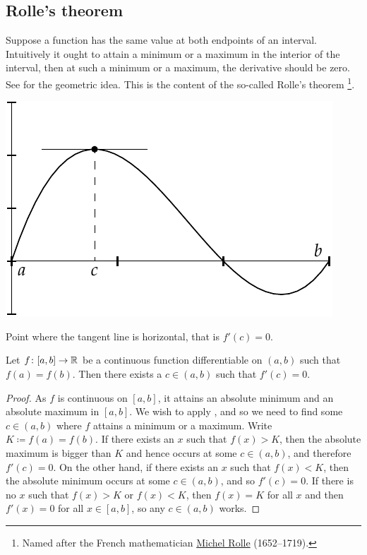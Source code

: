 \subsection{Rolle's theorem}

Suppose a function has the same value at both endpoints of an interval.
Intuitively it ought to attain a minimum or a maximum in the interior of the
interval,
then at such a minimum or a maximum, the derivative should be zero.
See  for the geometric idea.  This is the content of the
so-called Rolle's theorem%
\footnote{Named after the French mathematician
\href{https://en.wikipedia.org/wiki/Michel_Rolle}{Michel Rolle}
(1652--1719).}.

\begin{myfigureht}
\includegraphics{figures/rollefig}
\caption{Point where the tangent line is horizontal, that is $f'(c) =
0$.\label{rollefig}}
\end{myfigureht}

\begin{thm}[Rolle] \label{thm:rolle}
Let $f \colon [a,b] \to {\mathbb{R}}$ be a continuous function
differentiable on $(a,b)$ such that $f(a) = f(b)$.
Then there exists a $c \in (a,b)$ such that $f'(c) = 0$.
\end{thm}

\begin{proof}
As $f$ is continuous on $[a,b]$, it attains an absolute minimum and an
absolute 
maximum in $[a,b]$.  We wish to apply , and
so we need to find some $c \in (a,b)$ where $f$ attains a minimum or a
maximum.
Write $K \coloneqq f(a) = f(b)$.
If there exists an $x$ such that $f(x) > K$, then the absolute
maximum is bigger than $K$ and hence occurs at some $c \in (a,b)$, and
therefore $f'(c) = 0$.  On the other hand, if there exists an $x$
such that $f(x) < K$, then the absolute minimum occurs at some
$c \in (a,b)$, and so $f'(c) = 0$.  If there is no $x$ such that
$f(x) > K$ or
$f(x) < K$, then $f(x) = K$ for all $x$ and then
$f'(x) = 0$ for all $x \in [a,b]$, so any $c \in (a,b)$ works.
\end{proof}

